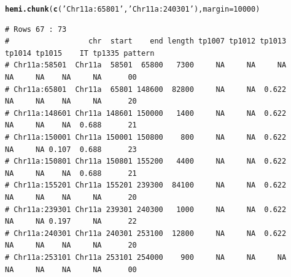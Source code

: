 \documentclass{article}\usepackage[]{graphicx}\usepackage[]{color}
\makeatletter
\newcommand{\hlnum}[1]{\textcolor[rgb]{0.686,0.059,0.569}{#1}}%
\newcommand{\hlstr}[1]{\textcolor[rgb]{0.192,0.494,0.8}{#1}}%
\newcommand{\hlstd}[1]{\textcolor[rgb]{0.345,0.345,0.345}{#1}}%
\newcommand{\hlkwc}[1]{\textcolor[rgb]{0.333,0.667,0.333}{#1}}%
\newcommand{\hlkwd}[1]{\textcolor[rgb]{0.737,0.353,0.396}{\textbf{#1}}}%
\newenvironment{kframe}{%
 \def\at@end@of@kframe{}%
 \ifinner\ifhmode%
  \def\at@end@of@kframe{\end{minipage}}%
  \begin{minipage}{\columnwidth}%
 \fi\fi%
 \def\FrameCommand##1{\hskip\@totalleftmargin \hskip-\fboxsep
 \colorbox{shadecolor}{##1}\hskip-\fboxsep
     \hskip-\linewidth \hskip-\@totalleftmargin \hskip\columnwidth}%
 \MakeFramed {\advance\hsize-\width
   \@totalleftmargin\z@ \linewidth\hsize
   \@setminipage}}%
 {\par\unskip\endMakeFramed%
 \at@end@of@kframe}
\newenvironment{knitrout}{}{} %
\makeatother
\begin{document}
\begin{knitrout}\footnotesize
{}\color{fgcolor}\begin{kframe}
\begin{alltt}
\hlkwd{hemi.chunk}\hlstd{(}\hlkwd{c}\hlstd{(}\hlstr{'Chr11a:65801'}\hlstd{,}\hlstr{'Chr11a:240301'}\hlstd{),}\hlkwc{margin}\hlstd{=}\hlnum{10000}\hlstd{)}
\end{alltt}
\begin{verbatim}
# Rows 67 : 73 
#                  chr  start    end length tp1007 tp1012 tp1013 tp1014 tp1015    IT tp1335 pattern
# Chr11a:58501  Chr11a  58501  65800   7300     NA     NA     NA     NA     NA    NA     NA      00
# Chr11a:65801  Chr11a  65801 148600  82800     NA     NA  0.622     NA     NA    NA     NA      20
# Chr11a:148601 Chr11a 148601 150000   1400     NA     NA  0.622     NA     NA    NA  0.688      21
# Chr11a:150001 Chr11a 150001 150800    800     NA     NA  0.622     NA     NA 0.107  0.688      23
# Chr11a:150801 Chr11a 150801 155200   4400     NA     NA  0.622     NA     NA    NA  0.688      21
# Chr11a:155201 Chr11a 155201 239300  84100     NA     NA  0.622     NA     NA    NA     NA      20
# Chr11a:239301 Chr11a 239301 240300   1000     NA     NA  0.622     NA     NA 0.197     NA      22
# Chr11a:240301 Chr11a 240301 253100  12800     NA     NA  0.622     NA     NA    NA     NA      20
# Chr11a:253101 Chr11a 253101 254000    900     NA     NA     NA     NA     NA    NA     NA      00
\end{verbatim}
\end{kframe}


\end{knitrout}
\end{document}
